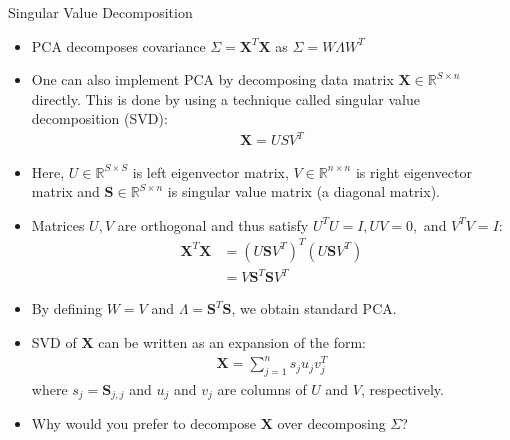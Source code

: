 \documentclass[9pt]{beamer}
\begin{document}
\begin{frame}{Singular Value Decomposition}

\begin{itemize}
\setlength{\itemsep}{3pt}
\item PCA decomposes covariance $\Sigma=\mathbf{X}^T\mathbf{X}$ as $\Sigma=W\Lambda W^T$

\item One can also implement PCA by decomposing data matrix $\mathbf{X}\in\mathbb{R}^{S\times n}$ directly. This is done by using a technique called singular value decomposition (SVD):
\begin{align*}
\mathbf{X}=USV^T
\end{align*}
\item Here, $U\in \mathbb{R}^{S\times S}$ is left eigenvector matrix, $V\in \mathbb{R}^{n\times n}$ is right eigenvector matrix and $\mathbf{S}\in \mathbb{R}^{S\times n}$ is singular value matrix (a diagonal matrix). 
\item Matrices $U,V$ are orthogonal and thus satisfy $U^TU=I,UV=0,$ and $V^TV=I$:
\begin{align*}
\mathbf{X}^T\mathbf{X}&=(U\mathbf{S}V^T)^T(U\mathbf{S}V^T)\\
&=V\mathbf{S}^T\mathbf{S}V^T
\end{align*}
\item By defining $W=V$ and $\Lambda=\mathbf{S}^T\mathbf{S}$, we obtain standard PCA. 
\item SVD of $\mathbf{X}$ can be written as an expansion of the form:
\begin{align*}
\mathbf{X}=\sum_{j=1}^ns_ju_jv_j^T
\end{align*}
where $s_j=\mathbf{S}_{j,j}$ and $u_j$ and $v_j$ are columns of $U$ and $V$, respectively. 
\item Why would you prefer to decompose $\mathbf{X}$ over decomposing $\Sigma$?
 
\end{itemize}


\end{frame}
\end{document}

